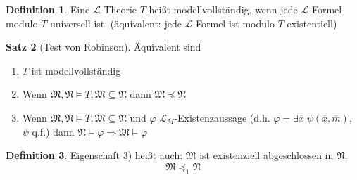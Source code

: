 \documentclass[12pt,parskip=full]{scrartcl}
\theoremstyle{definition}
\newtheorem{theorem}{Satz}[section]
\newtheorem{definition}[theorem]{Definition}
\begin{document}
	\begin{definition}
		Eine $\mathcal{L}$-Theorie $T$ heißt modellvollständig, wenn jede $\mathcal{L}$-Formel modulo $T$ universell ist. (äquivalent: jede $\mathcal{L}$-Formel ist modulo $T$ existentiell)
	\end{definition}

	\begin{theorem}[Test von Robinson]
		Äquivalent sind
		\begin{enumerate}
			\item $T$ ist modellvollständig
			\item Wenn $\mathfrak{M}, \mathfrak{N} \models T, \mathfrak{M} \subseteq \mathfrak{N}$ dann $\mathfrak{M} \preccurlyeq \mathfrak{N}$
			\item Wenn $\mathfrak{M}, \mathfrak{N} \models T, \mathfrak{M} \subseteq \mathfrak{N}$ und $\varphi$ $\mathcal{L}_M$-Existenzaussage (d.h. $\varphi = \exists \overline{x} \; \psi(\overline{x}, \overline{m})$, $\psi$ q.f.) dann $\mathfrak{N} \models \varphi \Rightarrow \mathfrak{M} \models \varphi$
		\end{enumerate}
	\end{theorem}
	
	\begin{definition}
		Eigenschaft 3) heißt auch: $\mathfrak{M}$ ist existenziell abgeschlossen in $\mathfrak{N}$.
		\begin{equation*}
			\mathfrak{M} \preccurlyeq_1 \mathfrak{N}
		\end{equation*}
	\end{definition}
\end{document}
